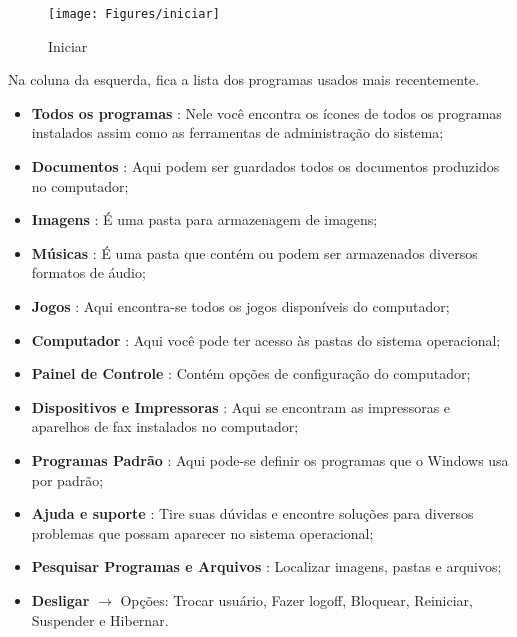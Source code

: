 \documentclass[hidelinks,12pt]{article}
\begin{document}
	\begin{figure}[!h]
		\centering
		\texttt{[image: Figures/iniciar]}
		\caption{Iniciar}
		\label{fig:iniciar}

	\end{figure}
	\newpage

	Na coluna da esquerda, fica a lista dos programas usados mais recentemente.

	\begin{itemize}

	\item \textbf{Todos os programas} : Nele você encontra os ícones de todos os programas instalados assim como as ferramentas de administração do sistema;

	\item \textbf{Documentos} : Aqui podem ser guardados todos os documentos produzidos no computador;

	\item \textbf{Imagens} : É uma pasta para armazenagem de imagens;

	\item \textbf{Músicas} : É uma pasta que contém ou podem ser armazenados diversos formatos de áudio;

	\item \textbf{Jogos} : Aqui encontra-se todos os jogos disponíveis do computador;

	\item \textbf{Computador} : Aqui você pode ter acesso às pastas do sistema operacional;

	\item \textbf{Painel de Controle} : Contém opções de configuração do computador;

	\item \textbf{Dispositivos e Impressoras} : Aqui se encontram as impressoras e aparelhos de fax instalados no computador;

	\item \textbf{Programas Padrão} : Aqui pode-se definir os programas que o Windows usa por padrão;

	\item \textbf{Ajuda e suporte} : Tire suas dúvidas e encontre soluções para diversos problemas que possam aparecer no sistema operacional;

	\item \textbf{Pesquisar Programas e Arquivos} : Localizar imagens, pastas e arquivos;

	\item \textbf{Desligar} $\rightarrow$ Opções: Trocar usuário, Fazer logoff, Bloquear, Reiniciar, Suspender e Hibernar.
	\end{itemize}
\end{document}
